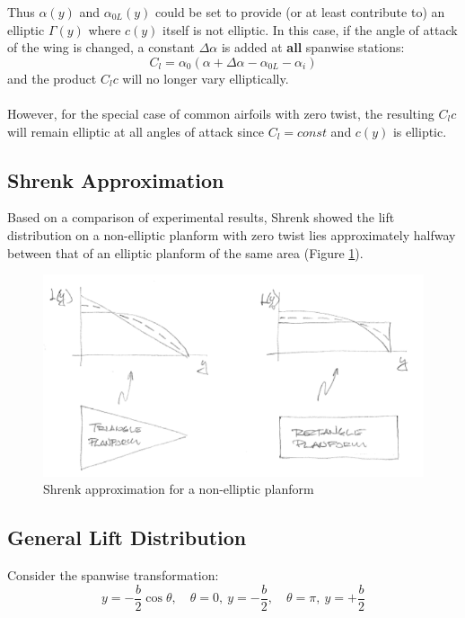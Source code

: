 \documentclass[draft=false, titlepage]{article}
\begin{document}
Thus $\alpha(y)$ and $\alpha_{0L}(y)$ could be set to provide (or at least contribute to) an elliptic $\Gamma(y)$ where $c(y)$ itself is not elliptic. In this case, if the angle of attack of the wing is changed, a constant $\Delta \alpha$ is added at \textbf{all} spanwise stations:
\begin{equation*}
    C_l = \alpha_0(\alpha + \Delta \alpha - \alpha_{0L} - \alpha_i)
\end{equation*}
and the product $C_l c$ will no longer vary elliptically.
\paragraph*{} However, for the special case of common airfoils with zero twist, the resulting $C_lc$ will remain elliptic at all angles of attack since $C_l = const$ and $c(y)$ is elliptic.

\subsection{Shrenk Approximation}
Based on a comparison of experimental results, Shrenk showed the lift distribution on a non-elliptic planform with zero twist lies approximately halfway between that of an elliptic planform of the same area (Figure \ref{fig:shrenkApproximationPg115}).

\begin{figure}[ht]
    \centering
    \includegraphics[width=0.8\linewidth]{Figures/shrenkApproximationPg115.PNG}
    \caption{Shrenk approximation for a non-elliptic planform}
    \label{fig:shrenkApproximationPg115}
\end{figure}

\subsection{General Lift Distribution}
Consider the spanwise transformation:
\begin{equation*}
y = -\frac{b}{2}\cos\theta,\quad \theta = 0,\ y = -\frac{b}{2},\quad \theta = \pi,\ y = +\frac{b}{2}
\end{equation*}
\end{document}
